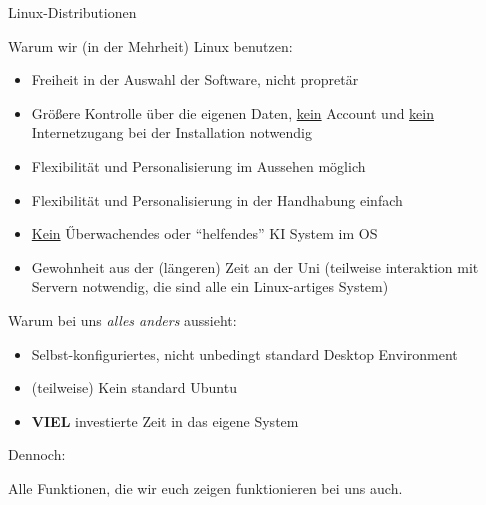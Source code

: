 \begin{frame}{Linux-Distributionen}



    Warum wir (in der Mehrheit) Linux benutzen:
    \begin{itemize}
        \item Freiheit in der Auswahl der Software, nicht propretär
        \item Größere Kontrolle über die eigenen Daten, \underline{kein} Account und
            \underline{kein} Internetzugang bei der Installation notwendig
        \item Flexibilität und Personalisierung im Aussehen möglich
        \item Flexibilität und Personalisierung in der Handhabung einfach
        \item \underline{Kein} Űberwachendes oder \enquote{helfendes} KI System im OS
        \item Gewohnheit aus der (längeren) Zeit an der Uni (teilweise interaktion mit Servern
            notwendig, die sind alle ein Linux-artiges System)
    \end{itemize}
    Warum bei uns \textit{alles anders} aussieht:
    \begin{itemize}
        \item Selbst-konfiguriertes, nicht unbedingt standard Desktop Environment
        \item (teilweise) Kein standard Ubuntu
        \item \textbf{VIEL} investierte Zeit in das eigene System
    \end{itemize}

    Dennoch:

    Alle Funktionen, die wir euch zeigen funktionieren bei uns auch.

\end{frame}
